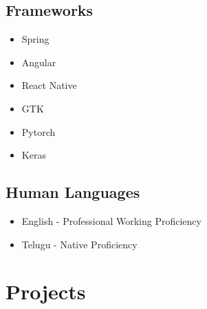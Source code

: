 \documentclass{article}
\begin{document}
\subsection{Frameworks}
\begin{multicols}{4}
    \begin{itemize}
    	\item Spring
    	\item Angular
        \item React Native
        \item GTK
        \item Pytorch
        \item Keras
    \end{itemize}
\end{multicols}


\subsection{Human Languages}
\begin{itemize}
    \item English - Professional Working Proficiency
    \item Telugu - Native Proficiency
\end{itemize}

\section{Projects}
\end{document}
